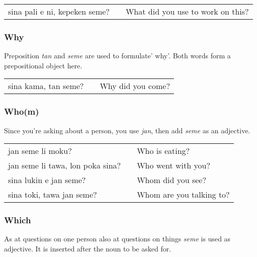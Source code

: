 \begin{supertabular}{p{5,5cm}|ll}
sina pali e ni, kepeken seme? &&  What did you use to work on this? \\
\end{supertabular} 
%
{}
\subsubsection*{Why}
%
Preposition \textit{tan} and \textit{seme} are used to formulate' why'. 
Both words form a prepositional object here.

\begin{supertabular}{p{5,5cm}|ll}
sina kama, tan seme? && Why did you come? \\
\end{supertabular} 
%
\subsubsection*{Who(m)}
%
Since you're asking about a person, you use \textit{jan}, then add \textit{seme} as an adjective. 

\begin{supertabular}{p{5,5cm}|ll}
jan seme li moku? && Who is eating? \\
jan seme li tawa, lon poka sina? && Who went with you? \\
sina lukin e jan seme? && Whom did you see? \\
sina toki, tawa jan seme? && Whom are you talking to? \\
\end{supertabular} 
%
\subsubsection*{Which}
%
As at questions on one person also at questions on things \textit{seme} is used as adjective. 
It is inserted after the noun to be asked for. 

